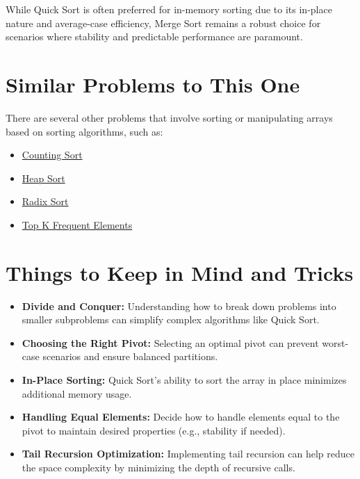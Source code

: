 While Quick Sort is often preferred for in-memory sorting due to its in-place nature and average-case efficiency, Merge Sort remains a robust choice for scenarios where stability and predictable performance are paramount.


\section*{Similar Problems to This One}
There are several other problems that involve sorting or manipulating arrays based on sorting algorithms, such as:
\begin{itemize}
    \item \hyperref[problem:counting_sort]{Counting Sort}
    \item \hyperref[problem:heap_sort]{Heap Sort}
    \item \hyperref[problem:radix_sort]{Radix Sort}
    \item \hyperref[problem:top_k_frequent_elements]{Top K Frequent Elements}
\end{itemize}

\section*{Things to Keep in Mind and Tricks}
\begin{itemize}
    \item \textbf{Divide and Conquer:} Understanding how to break down problems into smaller subproblems can simplify complex algorithms like Quick Sort.
    
    \item \textbf{Choosing the Right Pivot:} Selecting an optimal pivot can prevent worst-case scenarios and ensure balanced partitions.
    
    \item \textbf{In-Place Sorting:} Quick Sort's ability to sort the array in place minimizes additional memory usage.
    
    \item \textbf{Handling Equal Elements:} Decide how to handle elements equal to the pivot to maintain desired properties (e.g., stability if needed).
    
    \item \textbf{Tail Recursion Optimization:} Implementing tail recursion can help reduce the space complexity by minimizing the depth of recursive calls.
\end{itemize}


